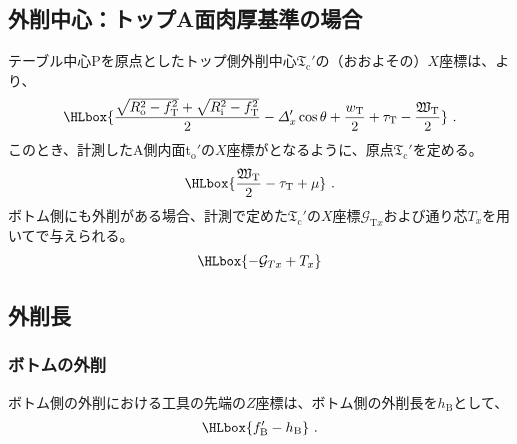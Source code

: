 \subsection{外削中心：トップA面肉厚基準の場合}
テーブル中心Pを原点としたトップ側外削中心$\mathfrak T_\mathrm c'$の（おおよその）$X$座標は、より、
\begin{align*}
  \HLbox{%
    \frac{\sqrt{R_\mathrm o^2-f_\mathrm T^2}+\sqrt{R_\mathrm i^2-f_\mathrm T^2}}2
    -\varDelta_x'\cos\theta
    +\frac{w_\mathrm T}2
    +\tau_\mathrm T
    -\frac{\mathfrak W_\mathrm T}2
  }\ .
\end{align*}
このとき、計測したA側内面t$_\mathrm o'$の$X$座標がとなるように、原点$\mathfrak T_\mathrm c'$を定める。
\begin{align*}
  \HLbox{\frac{\mathfrak W_\mathrm T}2-\tau_\mathrm T+\mu}~.
\end{align*}
ボトム側にも外削がある場合、計測で定めた$\mathfrak T_\mathrm c'$の$X$座標$\mathcal G_{\mathrm Tx}$および通り芯$T_x$を用いてで与えられる。
\begin{align*}
  \HLbox{-\mathcal G_{Tx}+T_x}
\end{align*}

\subsection{外削長}

\subsubsection{ボトムの外削}
ボトム側の外削における工具の先端の$Z$座標は、ボトム側の外削長を$h_\mathrm B$として、
\begin{align*}
  \HLbox{f_\mathrm B'-h_\mathrm B}\ .
\end{align*}

\clearpage
